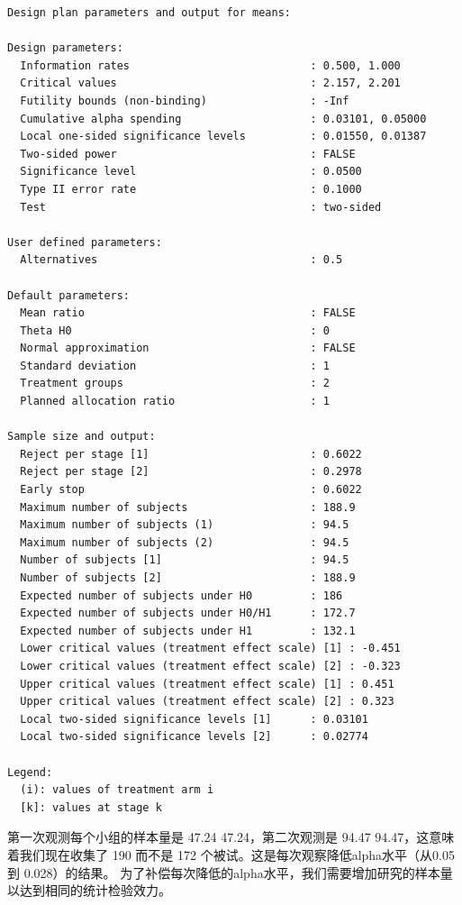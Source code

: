 \documentclass[
  letterpaper,
  DIV=11,
  numbers=noendperiod]{scrreprt}
\begin{document}
\begin{verbatim}
Design plan parameters and output for means:

Design parameters:
  Information rates                            : 0.500, 1.000 
  Critical values                              : 2.157, 2.201 
  Futility bounds (non-binding)                : -Inf 
  Cumulative alpha spending                    : 0.03101, 0.05000 
  Local one-sided significance levels          : 0.01550, 0.01387 
  Two-sided power                              : FALSE 
  Significance level                           : 0.0500 
  Type II error rate                           : 0.1000 
  Test                                         : two-sided 

User defined parameters:
  Alternatives                                 : 0.5 

Default parameters:
  Mean ratio                                   : FALSE 
  Theta H0                                     : 0 
  Normal approximation                         : FALSE 
  Standard deviation                           : 1 
  Treatment groups                             : 2 
  Planned allocation ratio                     : 1 

Sample size and output:
  Reject per stage [1]                         : 0.6022 
  Reject per stage [2]                         : 0.2978 
  Early stop                                   : 0.6022 
  Maximum number of subjects                   : 188.9 
  Maximum number of subjects (1)               : 94.5 
  Maximum number of subjects (2)               : 94.5 
  Number of subjects [1]                       : 94.5 
  Number of subjects [2]                       : 188.9 
  Expected number of subjects under H0         : 186 
  Expected number of subjects under H0/H1      : 172.7 
  Expected number of subjects under H1         : 132.1 
  Lower critical values (treatment effect scale) [1] : -0.451 
  Lower critical values (treatment effect scale) [2] : -0.323 
  Upper critical values (treatment effect scale) [1] : 0.451 
  Upper critical values (treatment effect scale) [2] : 0.323 
  Local two-sided significance levels [1]      : 0.03101 
  Local two-sided significance levels [2]      : 0.02774 

Legend:
  (i): values of treatment arm i
  [k]: values at stage k
\end{verbatim}

第一次观测每个小组的样本量是 47.24 47.24，第二次观测是 94.47
94.47，这意味着我们现在收集了 190 而不是 172
个被试。这是每次观察降低alpha水平（从0.05到 0.028）的结果。
为了补偿每次降低的alpha水平，我们需要增加研究的样本量以达到相同的统计检验效力。
\end{document}
